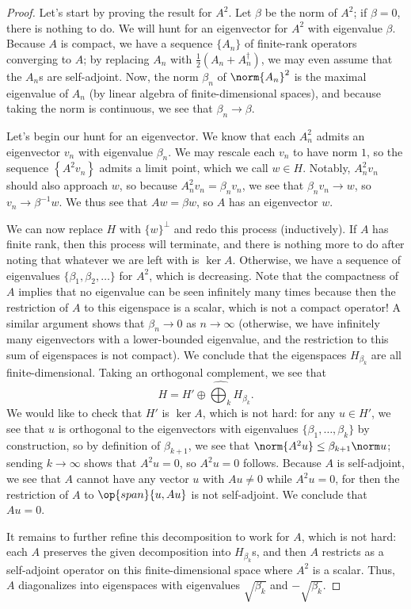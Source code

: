 \documentclass[../notes.tex]{subfiles}
\begin{document}
\begin{proof}
	Let's start by proving the result for $A^2$. Let $\beta$ be the norm of $A^2$; if $\beta=0$, there is nothing to do. We will hunt for an eigenvector for $A^2$ with eigenvalue $\beta$. Because $A$ is compact, we have a sequence $\{A_n\}$ of finite-rank operators converging to $A$; by replacing $A_n$ with $\frac12(A_n+A_n^\dagger)$, we may even assume that the $A_n$s are self-adjoint. Now, the norm $\beta_n$ of $\norm{A_n}^2$ is the maximal eigenvalue of $A_n$ (by linear algebra of finite-dimensional spaces), and because taking the norm is continuous, we see that $\beta_n\to\beta$.

	Let's begin our hunt for an eigenvector. We know that each $A_n^2$ admits an eigenvector $v_n$ with eigenvalue $\beta_n$. We may rescale each $v_n$ to have norm $1$, so the sequence $\left\{A^2v_n\right\}$ admits a limit point, which we call $w\in H$. Notably, $A_n^2v_n$ should also approach $w$, so because $A_n^2v_n=\beta_nv_n$, we see that $\beta_nv_n\to w$, so $v_n\to\beta^{-1}w$. We thus see that $Aw=\beta w$, so $A$ has an eigenvector $w$.

	We can now replace $H$ with $\{w\}^\perp$ and redo this process (inductively). If $A$ has finite rank, then this process will terminate, and there is nothing more to do after noting that whatever we are left with is $\ker A$. Otherwise, we have a sequence of eigenvalues $\{\beta_1,\beta_2,\ldots\}$ for $A^2$, which is decreasing. Note that the compactness of $A$ implies that no eigenvalue can be seen infinitely many times because then the restriction of $A$ to this eigenspace is a scalar, which is not a compact operator! A similar argument shows that $\beta_n\to0$ as $n\to\infty$ (otherwise, we have infinitely many eigenvectors with a lower-bounded eigenvalue, and the restriction to this sum of eigenspaces is not compact). We conclude that the eigenspaces $H_{\beta_k}$ are all finite-dimensional. Taking an orthogonal complement, we see that
	\[H=H'\oplus\widehat{\bigoplus_k}H_{\beta_k}.\]
	We would like to check that $H'$ is $\ker A$, which is not hard: for any $u\in H'$, we see that $u$ is orthogonal to the eigenvectors with eigenvalues $\{\beta_1,\ldots,\beta_k\}$ by construction, so by definition of $\beta_{k+1}$, we see that $\norm{A^2u}\le\beta_{k+1}\norm u$; sending $k\to\infty$ shows that $A^2u=0$, so $A^2u=0$ follows. Because $A$ is self-adjoint, we see that $A$ cannot have any vector $u$ with $Au\ne0$ while $A^2u=0$, for then the restriction of $A$ to $\op{span}\{u,Au\}$ is not self-adjoint. We conclude that $Au=0$.

	It remains to further refine this decomposition to work for $A$, which is not hard: each $A$ preserves the given decomposition into $H_{\beta_k}$s, and then $A$ restricts as a self-adjoint operator on this finite-dimensional space where $A^2$ is a scalar. Thus, $A$ diagonalizes into eigenspaces with eigenvalues $\sqrt{\beta_k}$ and $-\sqrt{\beta_k}$.
\end{proof}
\end{document}
